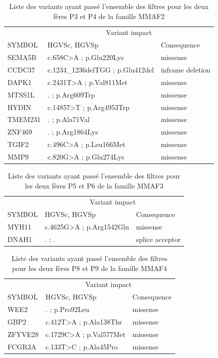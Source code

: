 \documentclass[12pt,a4paper,twoside]{ugathesis}
\theoremstyle{definition}
\theoremstyle{definition}
\theoremstyle{definition}
\theoremstyle{remark}
\begin{document}
\begin{longtable}[t]{lll}
\caption{\label{tab:tabmmaf2}Liste des variants ayant passé l'ensemble des filtres pour les deux fères P3 et P4 de la famille MMAF2}\\
\toprule
\multicolumn{1}{c}{ } & \multicolumn{2}{c}{Variant impact} \\
\cmidrule(l{2pt}r{2pt}){2-3}
SYMBOL & HGVSc, HGVSp & Consequence\\
\midrule
SEMA5B & c.658C>A ; p.Glu220Lys & missense\\
CCDC37 & c.1234\_1236delTGG ; p.Glu412del & inframe deletion\\
DAPK1 & c.2431T>A ; p.Val811Met & missense\\
MTSS1L & . ; p.Arg609Trp & missense\\
HYDIN & c.14857>T ; p.Arg4953Trp & missense\\
\addlinespace
TMEM231 & . ; p.Ala71Val & missense\\
ZNF469 & . ; p.Arg1864Lys & missense\\
TGIF2 & c.496C>A ; p.Leu166Met & missense\\
MMP9 & c.820G>A ; p.Glu274Lys & missense\\
\bottomrule
\end{longtable}

\begin{longtable}[t]{lll}
\caption{\label{tab:tabmmaf3}Liste des variants ayant passé l'ensemble des filtres pour les deux fères P5 et P6 de la famille MMAF3}\\
\toprule
\multicolumn{1}{c}{ } & \multicolumn{2}{c}{Variant impact} \\
\cmidrule(l{2pt}r{2pt}){2-3}
SYMBOL & HGVSc, HGVSp & Consequence\\
\midrule
MYH11 & c.4625G>A ; p.Arg1542Gln & missense\\
DNAH1 & . ; . & splice acceptor\\
\bottomrule
\end{longtable}

\begin{longtable}[t]{lll}
\caption{\label{tab:tabmmaf4}Liste des variants ayant passé l'ensemble des filtres pour les deux fères P8 et P9 de la famille MMAF4}\\
\toprule
\multicolumn{1}{c}{ } & \multicolumn{2}{c}{Variant impact} \\
\cmidrule(l{2pt}r{2pt}){2-3}
SYMBOL & HGVSc, HGVSp & Consequence\\
\midrule
WEE2 & . ; p.Pro92Leu & missense\\
GBP2 & c.412T>A ; p.Ala138Thr & missense\\
ZFYVE28 & c.1729C>A ; p.Val577Met & missense\\
FCGR3A & c.133T>C ; p.Ala45Pro & missense\\
\bottomrule
\end{longtable}
\end{document}
